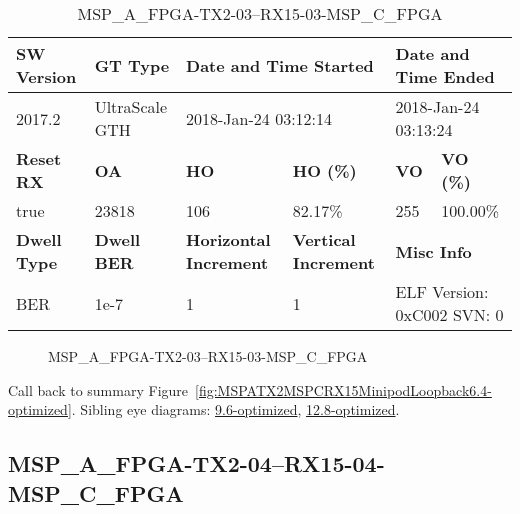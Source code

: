 \begin{table}[h]
\centering
\caption{MSP\_A\_FPGA-TX2-03--RX15-03-MSP\_C\_FPGA}
\label{tab:MSPAFPGATX203RX1503MSPCFPGA6.4-optimized}
\begin{tabular}{@{}|l|l|l|l|l|l|@{}}
\toprule
\textbf{SW Version}                & \textbf{GT Type}   & \multicolumn{2}{l|}{\textbf{Date and Time Started}}            & \multicolumn{2}{l|}{\textbf{Date and Time Ended}}        \\ \midrule
2017.2                       & UltraScale GTH          & \multicolumn{2}{l|}{2018-Jan-24 03:12:14}                   & \multicolumn{2}{l|}{2018-Jan-24 03:13:24}               \\ \midrule
\textbf{Reset RX}                  & \textbf{OA} & \textbf{HO}   & \textbf{HO (\%)} & \textbf{VO} & \textbf{VO (\%)} \\ \midrule
true & 23818        & 106          & 82.17\%        & 255        & 100.00\%       \\ \midrule
\textbf{Dwell Type}                & \textbf{Dwell BER} & \textbf{Horizontal Increment} & \textbf{Vertical Increment}    & \multicolumn{2}{l|}{\textbf{Misc Info}}                  \\ \midrule
BER                            & 1e-7        & 1        & 1           & \multicolumn{2}{l|}{ELF Version: 0xC002 SVN: 0}                         \\ \bottomrule
\end{tabular}
\end{table}

\begin{figure}[h]
\caption{MSP\_A\_FPGA-TX2-03--RX15-03-MSP\_C\_FPGA} \label{fig:MSPAFPGATX203RX1503MSPCFPGA6.4-optimized}
\end{figure}

Call back to summary Figure~\ref{fig:MSPATX2MSPCRX15MinipodLoopback6.4-optimized}.
Sibling eye diagrams: \hyperref[sec:MSPAFPGATX203RX1503MSPCFPGA9.6-optimized]{9.6-optimized}, \hyperref[sec:MSPAFPGATX203RX1503MSPCFPGA12.8-optimized]{12.8-optimized}.

\clearpage
\newpage


\subsection{MSP\_A\_FPGA-TX2-04--RX15-04-MSP\_C\_FPGA}\label{sec:MSPAFPGATX204RX1504MSPCFPGA6.4-optimized}

